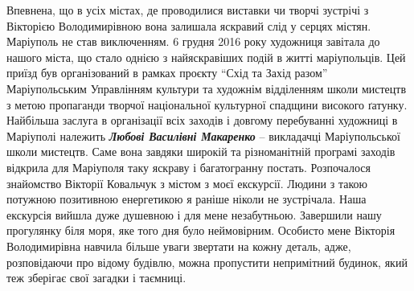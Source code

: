 
Впевнена, що в усіх містах, де проводилися виставки чи творчі зустрічі з
Вікторією Володимирівною вона залишала яскравий слід у серцях містян. Маріуполь
не став виключенням. 6 грудня 2016 року художниця завітала до нашого міста, що
стало однією з найяскравіших подій в житті маріупольців. Цей приїзд був
організований в рамках проєкту \enquote{Схід та Захід разом} Маріупольським Управлінням
культури та художнім відділенням школи мистецтв з метою пропаганди творчої
національної культурної спадщини високого ґатунку. Найбільша заслуга в
організації всіх заходів і довгому перебуванні художниці в Маріуполі належить
\emph{\textbf{Любові Василівні Макаренко}} – викладачці Маріупольської школи мистецтв. Саме
вона завдяки широкій та різноманітній програмі заходів відкрила для Маріуполя
таку яскраву і багатогранну постать. Розпочалося знайомство Вікторії Ковальчук
з містом з моєї екскурсії. Людини з такою потужною позитивною енергетикою я
раніше ніколи не зустрічала. Наша екскурсія вийшла дуже душевною і для мене
незабутньою. Завершили нашу прогулянку біля моря, яке того дня було
неймовірним. Особисто мене Вікторія Володимирівна навчила більше уваги звертати
на кожну деталь, адже, розповідаючи про відому будівлю, можна пропустити
непримітний будинок, який теж зберігає свої загадки і таємниці.


